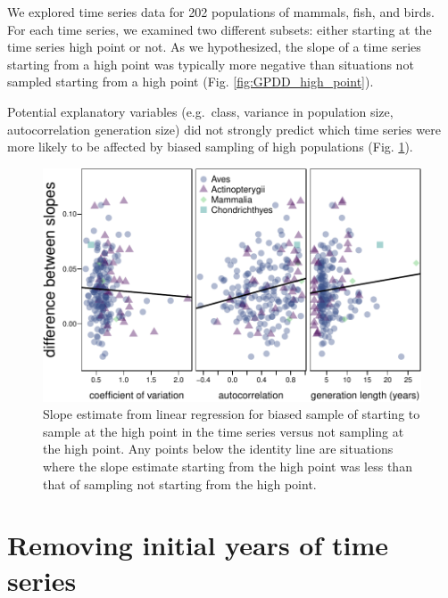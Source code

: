 \documentclass[]{article}
\begin{document}
We explored time series data for 202 populations of mammals, fish, and
birds. For each time series, we examined two different subsets: either
starting at the time series high point or not. As we hypothesized, the
slope of a time series starting from a high point was typically more
negative than situations not sampled starting from a high point (Fig.
\ref{fig:GPDD_high_point}).

Potential explanatory variables (e.g.~class, variance in population
size, autocorrelation generation size) did not strongly predict which
time series were more likely to be affected by biased sampling of high
populations (Fig. \ref{fig:GPDD_explanatory}).

\begin{figure}[htbp]
\centering
\includegraphics{Empirical_Investigation_files/figure-latex/unnamed-chunk-6-1.pdf}
\caption{Slope estimate from linear regression for biased sample of
starting to sample at the high point in the time series versus not
sampling at the high point. Any points below the identity line are
situations where the slope estimate starting from the high point was
less than that of sampling not starting from the high
point.\label{fig:GPDD_explanatory}}
\end{figure}

\pagebreak

\section{Removing initial years of time series}
\end{document}
